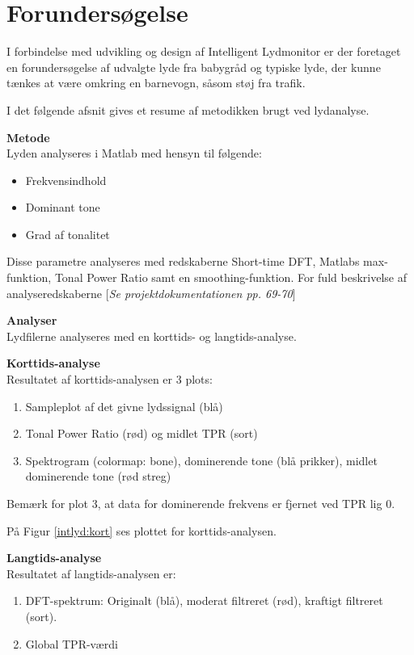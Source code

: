 \section{Forundersøgelse}
I forbindelse med udvikling og design af Intelligent Lydmonitor er der foretaget en forundersøgelse af udvalgte lyde fra babygråd og typiske lyde, der kunne tænkes at være omkring en barnevogn, såsom støj fra trafik.

I det følgende afsnit gives et resume af metodikken brugt ved lydanalyse. 

\textbf{Metode} \\
Lyden analyseres i Matlab med hensyn til følgende: 
\begin{itemize}
\item Frekvensindhold
\item Dominant tone
\item Grad af tonalitet
\end{itemize}

Disse parametre analyseres med redskaberne Short-time DFT, Matlabs max-funktion, Tonal Power Ratio samt en smoothing-funktion. For fuld beskrivelse af analyseredskaberne [\textit{Se projektdokumentationen pp. 69-70}]

\textbf{Analyser}\\
Lydfilerne analyseres med en korttids- og langtids-analyse. 

\textbf{Korttids-analyse}\\
Resultatet af korttids-analysen er 3 plots:
\begin{enumerate}
\item Sampleplot af det givne lydssignal (blå)
\item Tonal Power Ratio (rød) og midlet TPR (sort)
\item Spektrogram (colormap: bone), dominerende tone (blå prikker), midlet dominerende tone (rød streg)
\end{enumerate}
Bemærk for plot 3, at data for dominerende frekvens er fjernet ved TPR lig 0.

På Figur \ref{intlyd:kort} ses plottet for korttids-analysen.



\textbf{Langtids-analyse} \\
Resultatet af langtids-analysen er:
\begin{enumerate}
\item DFT-spektrum: Originalt (blå), moderat filtreret (rød), kraftigt filtreret (sort).
\item Global TPR-værdi
\end{enumerate}

